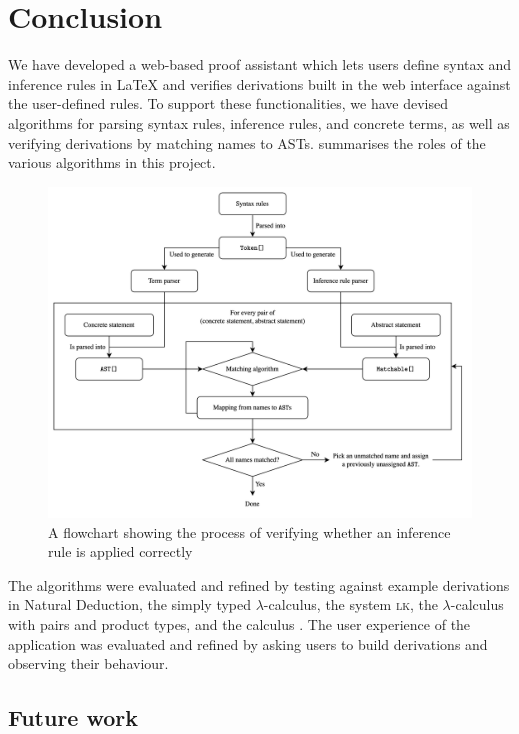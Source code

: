 \chapter{Conclusion}
We have developed a web-based proof assistant which lets users define syntax and inference rules in \LaTeX{} and verifies derivations built in the web interface against the user-defined rules. To support these functionalities, we have devised algorithms for parsing syntax rules, inference rules, and concrete terms, as well as verifying derivations by matching names to ASTs.  summarises the roles of the various algorithms in this project.

\begin{figure}[!htbp]
    \centering
    \includegraphics[width=\textwidth]{conclusion/flowchart.png}
    \caption{A flowchart showing the process of verifying whether an inference rule is applied correctly}
    \label{fig:conclusion:flowchart}
\end{figure}

The algorithms were evaluated and refined by testing against example derivations in Natural Deduction, the simply typed $\lambda$-calculus, the system \textsc{lk}, the $\lambda$-calculus with pairs and product types, and the calculus \lbm. The user experience of the application was evaluated and refined by asking users to build derivations and observing their behaviour.

\section{Future work}
